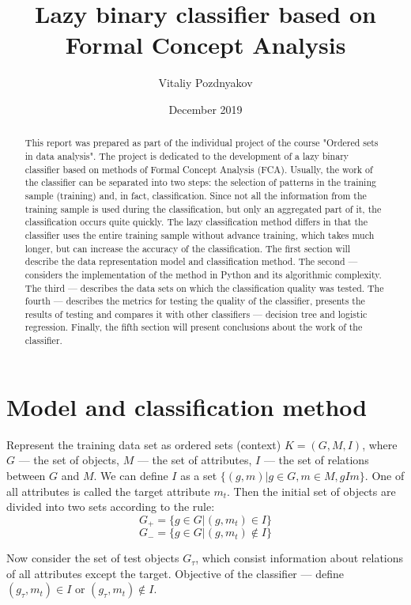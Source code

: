 \documentclass{article}
\author{Vitaliy Pozdnyakov}
\title{Lazy binary classifier based on \\Formal Concept Analysis}
\date{December 2019}
\begin{document}
\maketitle

\begin{abstract}
	This report was prepared as part of the individual project of the course "Ordered sets in data analysis". The project is dedicated to the development of a lazy binary classifier based on methods of Formal Concept Analysis (FCA). Usually, the work of the classifier can be separated into two steps: the selection of patterns in the training sample (training) and, in fact, classification. Since not all the information from the training sample is used during the classification, but only an aggregated part of it, the classification occurs quite quickly. The lazy classification method differs in that the classifier uses the entire training sample without advance training, which takes much longer, but can increase the accuracy of the classification. The first section will describe the data representation model and classification method. The second --- considers the implementation of the method in Python and its algorithmic complexity. The third --- describes the data sets on which the classification quality was tested. The fourth --- describes the metrics for testing the quality of the classifier, presents the results of testing and compares it with other classifiers --- decision tree and logistic regression. Finally, the fifth section will present conclusions about the work of the classifier.
\end{abstract}

\section{Model and classification method}

Represent the training data set as ordered sets (context) $K = (G, M, I)$, where $G$ --- the set of objects, $M$ --- the set of attributes, $I$ --- the set of relations between $G$ and $M$. We can define $I$ as a set $\{(g, m)|g \in G, m \in M, gIm\}$. One of all attributes is called the target attribute $m_t$. Then the initial set of objects are divided into two sets according to the rule:
$$G_+ = \{g \in G|(g, m_t) \in I\}$$
$$G_- = \{g \in G| (g, m_t) \notin I\}$$

Now consider the set of test objects $G_\tau$, which consist information about relations of all attributes except the target. Objective of the classifier --- define $(g_\tau, m_t) \in I$ or $(g_\tau, m_t) \notin I$. 
\end{document}
